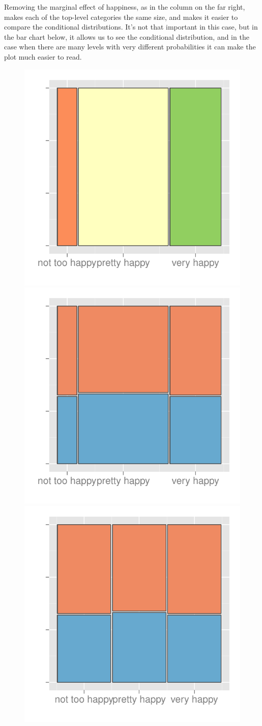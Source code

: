 \documentclass[letterpaper,oneside]{scrartcl}
\begin{document}
Removing the marginal effect of happiness, as in the column on the far right, makes each of the top-level categories the same size, and makes it easier to compare the conditional distributions.  It's not that important in this case, but in the bar chart below, it allows us to see the conditional distribution, and in the case when there are many levels with very different probabilities it can make the plot much easier to read.

\begin{figure}[htbp]
  \centering
  \includegraphics[width=0.33\linewidth]{fact-happy}%
  \includegraphics[width=0.33\linewidth]{fact-happy-sex}%
  \includegraphics[width=0.33\linewidth]{fact-happy|sex}


\end{figure}
\end{document}
